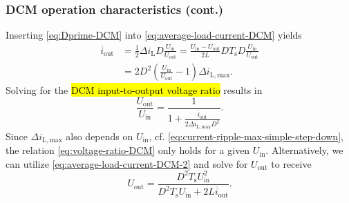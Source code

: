\begin{frame}
    \frametitle{DCM operation characteristics (cont.)}
    Inserting \eqref{eq:Dprime-DCM} into \eqref{eq:average-load-current-DCM} yields
    \begin{equation}
        \begin{split}
            \overline{i}_\mathrm{out} &= \frac{1}{2}\Delta i_\mathrm{L}D\frac{U_\mathrm{in}}{U_\mathrm{out}} = \frac{U_\mathrm{in}-U_\mathrm{out}}{2L}DT_\mathrm{s}D\frac{U_\mathrm{in}}{U_\mathrm{out}}\\ &= 2D^2\left(\frac{U_\mathrm{in}}{U_\mathrm{out}}-1\right)\Delta i_\mathrm{L,max}.
        \end{split}
        \label{eq:average-load-current-DCM-2}
    \end{equation}
    Solving for the \hl{DCM input-to-output voltage ratio} results in
    \begin{equation}
        \frac{U_\mathrm{out}}{U_\mathrm{in}} = \frac{1}{1+\frac{\overline{i}_\mathrm{out}}{2\Delta i_\mathrm{L,max}D^2}}.
        \label{eq:voltage-ratio-DCM}
    \end{equation}
    Since $\Delta i_\mathrm{L,max}$ also depends on $U_\mathrm{in}$, cf.  \eqref{eq:current-ripple-max-simple-step-down}, the relation \eqref{eq:voltage-ratio-DCM} only holds for a given $U_\mathrm{in}$. Alternatively, we can utilize \eqref{eq:average-load-current-DCM-2} and solve for $U_\mathrm{out}$ to receive
    \begin{equation}
        U_\mathrm{out} = \frac{D^2T_\mathrm{s}U_\mathrm{in}^2}{D^2T_\mathrm{s}U_\mathrm{in}+2L\overline{i}_\mathrm{out}}.
    \end{equation}
\end{frame}

